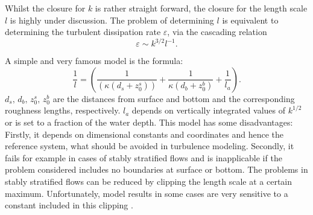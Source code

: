 Whilst the closure for $k$ is rather straight forward, the closure for the 
length scale $l$ is highly under discussion. The problem of 
determining $l$ is equivalent to determining the turbulent dissipation rate 
$\varepsilon$, via the cascading relation \citep[][]{UmlaufBurchard2005a} 
\begin{equation}
 \label{cascad}
 \varepsilon \sim k^{3 \slash 2} l^{-1}.
\end{equation}

A simple and very famous model is the \cite{blackadar1962} formula:
\begin{equation}
 \label{blackadar}
 \frac{1}{l} = \left( \frac{1}{(\kappa (d_s + z_0^s) )} + \frac{1}{\kappa (d_b + 
z_0^b)} + \frac{1}{l_a} \right).
\end{equation}
$d_s,\, d_b,\, z_0^s,\, z_0^b$ are the distances from surface and bottom and 
the corresponding roughness lengths, respectively. $l_a$ depends on vertically 
integrated values of $k^{1 \slash 2}$ or is set to a fraction of the water 
depth. This model has some disadvantages: Firstly, it depends on dimensional 
constants and coordinates and hence the reference system, what should be 
avoided in turbulence modeling. Secondly, it fails for example in cases of 
stably stratified flows and is inapplicable if the problem considered includes 
no boundaries at surface or bottom. The problems in stably stratified flows can 
be reduced 
by clipping the length scale at a certain maximum. Unfortunately, model results 
in some cases are very sensitive to a constant included in this clipping 
\citep[][]{UmlaufBurchard2005a}. 


